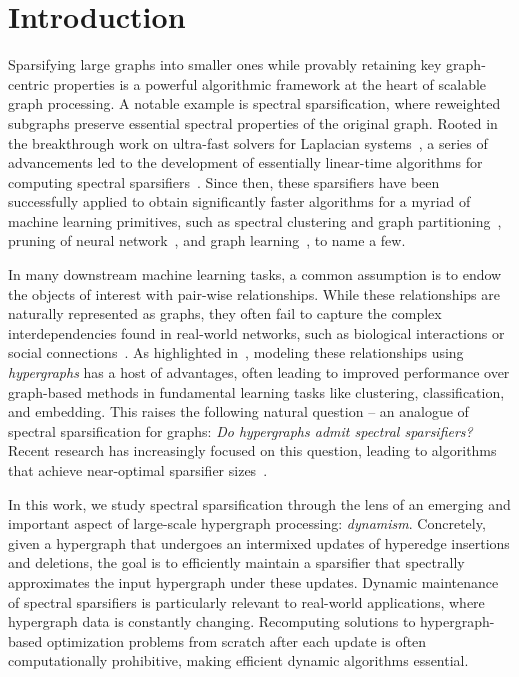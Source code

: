 \section{Introduction}


Sparsifying large graphs into smaller ones while provably retaining key graph-centric properties is a powerful algorithmic framework at the heart of scalable graph processing. A notable example is spectral sparsification, where reweighted subgraphs preserve essential spectral properties of the original graph. Rooted in the breakthrough work on ultra-fast solvers for Laplacian systems~\cite{Spielman:2004aa}, a series of advancements led to the development of essentially linear-time algorithms for computing spectral sparsifiers~\cite{Spielman:2008aa,Spielman:2011aa,Batson:2012aa}. Since then, these sparsifiers have been successfully applied to obtain significantly faster algorithms for a myriad of machine learning primitives, such as spectral clustering and graph partitioning~\cite{Lee:2014aa,Peng:2017aa,Feng:2018aa}, pruning of neural network~\cite{Hoang:2023aa,Laenen:2023aa}, and graph learning~\cite{Calandriello:2018aa}, to name a few.

In many downstream machine learning tasks, a common assumption is to endow the objects of interest with pair-wise relationships. While these relationships are naturally represented as graphs, they often fail to capture the complex interdependencies found in real-world networks, such as biological interactions or social connections~\cite{Bonacich:2004aa}. As highlighted in~\cite{Zhou:2006aa}, modeling these relationships using \emph{hypergraphs} has a host of advantages, often leading to improved performance over graph-based methods in fundamental learning tasks like clustering, classification, and embedding. This raises the following natural question -- an analogue of spectral sparsification for graphs: \emph{Do hypergraphs admit spectral sparsifiers?} Recent research has increasingly focused on this question, leading to algorithms that achieve near-optimal sparsifier sizes~\cite{Kapralov:2021aa,Kapralov:2021ab,Oko:2023aa,Jambulapati:2023aa,Lee:2023aa}.

In this work, we study spectral sparsification through the lens of an emerging and important aspect of large-scale hypergraph processing: \emph{dynamism}. Concretely, given a hypergraph that undergoes an intermixed updates of hyperedge insertions and deletions, the goal is to efficiently maintain a sparsifier that spectrally approximates the input hypergraph under these updates. Dynamic maintenance of spectral sparsifiers is particularly relevant to real-world applications, where hypergraph data is constantly changing. Recomputing solutions to hypergraph-based optimization problems from scratch after each update is often computationally prohibitive, making efficient dynamic algorithms essential.

